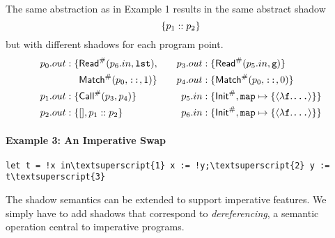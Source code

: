 \documentclass{article}
\begin{document}
The same abstraction as in Example 1 results in the same abstract shadow
\[\{p_1::p_2\}\]
but with different shadows for each program point.
\begin{align*}
  p_0.{out} :\{ & {\mathsf{Read}}^{\#}(p_6.{in},\texttt{lst}), &  &  & p_3.{out}:\{ & {\mathsf{Read}}^{\#}(p_5.{in},\texttt{g})\}                                 \\
                               & {\textsf{Match}}^{\#}(p_0,\texttt{::},1)\}   &  &  & p_4.{out}:\{ & {\textsf{Match}}^{\#}(p_0,\texttt{::},0)\}                                  \\
  p_1.{out} :\{ & {\mathsf{Call}}^{\#}(p_3,p_4)\}                 &  &  & p_5.{in} :\{ & {\mathsf{Init}}^{\#},\texttt{map}\mapsto\{\langle\lambda\texttt{f}.\texttt{...}\rangle\}\} \\
  p_2.{out} :\{ & [],p_1:: p_2\}                     &  &  & p_6.{in} :\{ & {\mathsf{Init}}^{\#},\texttt{map}\mapsto\{\langle\lambda\texttt{f}.\texttt{...}\rangle\}\}
\end{align*}

\paragraph{Example 3: An Imperative Swap}
\begin{center}
  \begin{BVerbatim}[commandchars=\\\{\}]
let t = !x in\textsuperscript{1} x := !y;\textsuperscript{2} y := t\textsuperscript{3}
  \end{BVerbatim}
\end{center}
The shadow semantics can be extended to support imperative features.
We simply have to add shadows that correspond to \emph{dereferencing}, a semantic
operation central to imperative programs.
\end{document}
